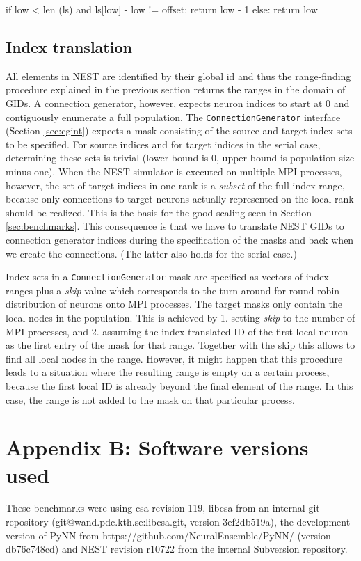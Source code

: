 \documentclass{frontiersSCNS} %
\begin{document}
\begin{pythoncode}
    if low < len (ls) and ls[low] - low != offset:
        return low - 1
    else:
        return low
\end{pythoncode}

\subsection*{Index translation}

All elements in NEST are identified by their global id and thus the
range-finding procedure explained in the previous section returns the
ranges in the domain of GIDs. A connection generator, however, expects
neuron indices to start at 0 and contiguously enumerate a full
population.  The \verb|ConnectionGenerator| interface (Section
\ref{sec:cgint}) expects a mask consisting of the source and target
index sets to be specified.  For source indices and for target indices
in the serial case, determining these sets is trivial (lower bound is
0, upper bound is population size minus one).  When the NEST simulator
is executed on multiple MPI processes, however, the set of target
indices in one rank is a \emph{subset} of the full index range,
because only connections to target neurons actually represented on the
local rank should be realized. This is the basis for the good scaling
seen in Section \ref{sec:benchmarks}.  This consequence is that we
have to translate NEST GIDs to connection generator indices during the
specification of the masks and back when we create the
connections. (The latter also holds for the serial case.)

Index sets in a \verb|ConnectionGenerator| mask are specified as
vectors of index ranges plus a \emph{skip} value which corresponds to
the turn-around for round-robin distribution of neurons onto MPI
processes.  The target masks only contain the local nodes in the
population. This is achieved by 1. setting \emph{skip} to the number
of MPI processes, and 2. assuming the index-translated ID of the first
local neuron as the first entry of the mask for that range. Together
with the skip this allows to find all local nodes in the
range. However, it might happen that this procedure leads to a
situation where the resulting range is empty on a certain process,
because the first local ID is already beyond the final element of the
range. In this case, the range is not added to the mask on that
particular process.

\section*{Appendix B: Software versions used}

These benchmarks were using csa revision 119, libcsa from an internal
git repository (git@wand.pdc.kth.se:libcsa.git, version 3ef2db519a),
the development version of PyNN from
https://github.com/NeuralEnsemble/PyNN/ (version db76c748cd) and NEST
revision r10722 from the internal Subversion repository.



\end{document}
